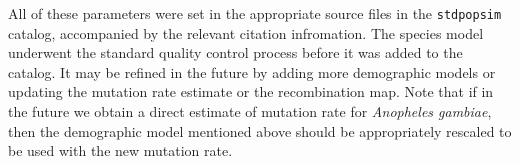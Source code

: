 \documentclass[hidelinks]{article}
\newcommand{\stdpopsim}{\texttt{stdpopsim}\xspace}
\begin{document}

All of these parameters were set in the appropriate source files in the \stdpopsim catalog,
accompanied by the relevant citation infromation.
The species model underwent the standard quality control process before it was added to the catalog.
It may be refined in the future by adding more demographic models or updating the mutation rate estimate
or the recombination map. Note that if in the future we obtain a direct estimate of mutation rate for
\emph{Anopheles gambiae}, then the demographic model mentioned above should be appropriately rescaled to be
used with the new mutation rate.



%
%
%
%
\end{document}
